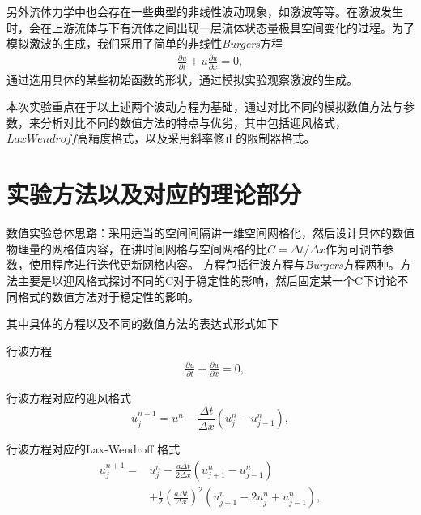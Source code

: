 \documentclass[10.5pt
]{article}
\begin{document}
另外流体力学中也会存在一些典型的非线性波动现象，如激波等等。在激波发生时，会在上游流体与下有流体之间出现一层流体状态量极具空间变化的过程。为了模拟激波的生成，我们采用了简单的非线性\textit{Burgers}方程
\begin{align}
\frac{\partial u}{\partial t} + u \frac{\partial u}{\partial x} = 0, \label{EqnBurgers}
\end{align}
通过选用具体的某些初始函数的形状，通过模拟实验观察激波的生成。

本次实验重点在于以上述两个波动方程为基础，通过对比不同的模拟数值方法与参数，来分析对比不同的数值方法的特点与优劣，其中包括迎风格式，$LaxWendroff$高精度格式，以及采用斜率修正的限制器格式。

\section{实验方法以及对应的理论部分}
数值实验总体思路：采用适当的空间间隔讲一维空间网格化，然后设计具体的数值物理量的网格值内容，在讲时间网格与空间网格的比$C = \Delta t / \Delta x$作为可调节参数，使用程序进行迭代更新网格内容。
方程包括行波方程与\textit{Burgers}方程两种。方法主要是以迎风格式探讨不同的C对于稳定性的影响，然后固定某一个C下讨论不同格式的数值方法对于稳定性的影响。

其中具体的方程以及不同的数值方法的表达式形式如下

行波方程
\begin{align}
& \frac{\partial u}{\partial t} + \frac{\partial u}{\partial x} = 0,
\label{EqnCon}
\end{align}

行波方程对应的迎风格式
\begin{equation}
u_j^{n+1} = u^n - \frac{\Delta t}{\Delta x} (u_j^n - u_{j-1}^n), \label{EqnUpwind}
\end{equation}

行波方程对应的Lax-Wendroff 格式
\begin{align}
	u_j^{n+1} 
	=&
	u_j^{n} 
	-
	\frac{a \Delta t}{ 2 \Delta x } (  	u_{j+1}^{n} - u_{j-1}^{n} ) \\
	&+ \frac{1}{2} \left( \frac{a \Delta t}{ \Delta x } \right)^2 (  	u_{j+1}^{n}- 2 u_j^n + u_{j-1}^{n} ),
\end{align}
\end{document}
